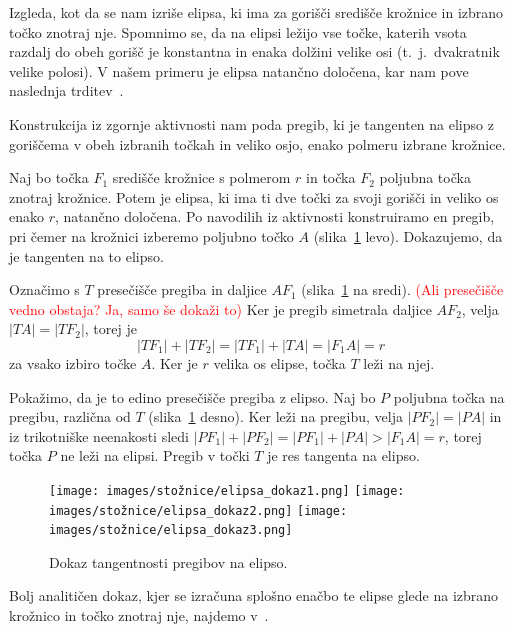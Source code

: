 Izgleda, kot da se nam izriše elipsa, ki ima za gorišči središče krožnice in izbrano točko znotraj nje. Spomnimo se, da na elipsi ležijo vse točke, katerih vsota razdalj do obeh gorišč je konstantna in enaka dolžini velike osi (t.\ j.\ dvakratnik velike polosi). V našem primeru je elipsa natančno določena, kar nam pove naslednja trditev~\cite[str.\ 60--61]{hull2013}.

\begin{trditev}
    Konstrukcija iz zgornje aktivnosti nam poda pregib, ki je tangenten na elipso z goriščema v obeh izbranih točkah in veliko osjo, enako polmeru izbrane krožnice.
\end{trditev}

\begin{dokaz}
    Naj bo točka $F_1$ središče krožnice s polmerom $r$ in točka $F_2$ poljubna točka znotraj krožnice. Potem je elipsa, ki ima ti dve točki za svoji gorišči in veliko os enako $r$, natančno določena. Po navodilih iz aktivnosti konstruiramo en pregib, pri čemer na krožnici izberemo poljubno točko $A$ (slika~\ref{fig:dokaz_elipsa} levo). Dokazujemo, da je tangenten na to elipso.

    Označimo s $T$ presečišče pregiba in daljice $AF_1$ (slika~\ref{fig:dokaz_elipsa} na sredi). \textcolor{red}{(Ali presečišče vedno obstaja? Ja, samo še dokaži to)} Ker je pregib simetrala daljice $AF_2$, velja $|TA| = |TF_2|$, torej je
    $$|TF_1| + |TF_2| = |TF_1| + |TA| = |F_1A| = r$$
    za vsako izbiro točke $A$. Ker je $r$ velika os elipse, točka $T$ leži na njej.

    Pokažimo, da je to edino presečišče pregiba z elipso. Naj bo $P$ poljubna točka na pregibu, različna od $T$ (slika~\ref{fig:dokaz_elipsa} desno). Ker leži na pregibu, velja $|PF_2| = |PA|$ in iz trikotniške neenakosti sledi $|PF_1| + |PF_2| = |PF_1| + |PA| > |F_1A| = r$, torej točka $P$ ne leži na elipsi. Pregib v točki $T$ je res tangenta na elipso.

    \begin{figure}[h]
        \centering
        \texttt{[image: images/stožnice/elipsa\_dokaz1.png]}
        \texttt{[image: images/stožnice/elipsa\_dokaz2.png]}
        \texttt{[image: images/stožnice/elipsa\_dokaz3.png]}
        \caption[Tangentnost na elipso]{Dokaz tangentnosti pregibov na elipso.}
        \label{fig:dokaz_elipsa}
    \end{figure}  
\end{dokaz}

Bolj analitičen dokaz, kjer se izračuna splošno enačbo te elipse glede na izbrano krožnico in točko znotraj nje, najdemo v~\cite[str.\ 204--205]{smith2003}.

